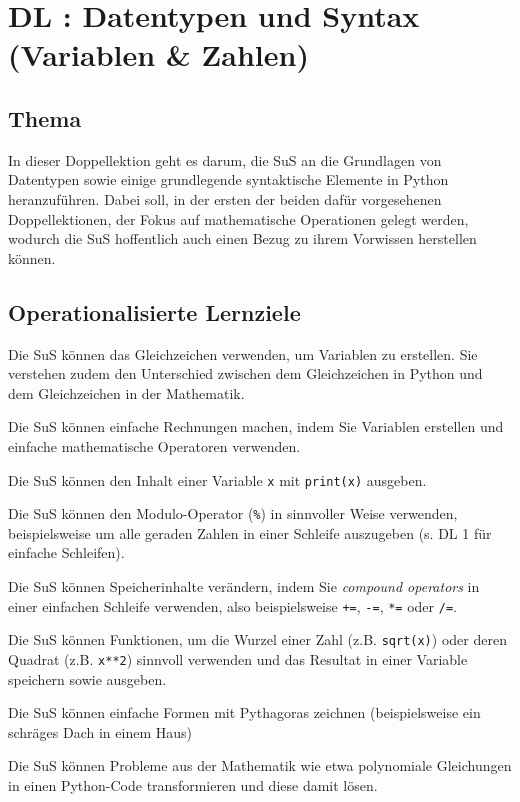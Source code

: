 \section{DL \themycounter: Datentypen und Syntax (Variablen \& Zahlen)}
\begin{myExBox}[title=DL \themycounter]
\subsection*{Thema}
In dieser Doppellektion geht es darum, die SuS an die Grundlagen von Datentypen sowie einige grundlegende syntaktische Elemente in Python heranzuführen. Dabei soll, in der ersten der beiden dafür vorgesehenen Doppellektionen, der Fokus auf mathematische Operationen gelegt werden, wodurch die SuS hoffentlich auch einen Bezug zu ihrem Vorwissen herstellen können.

\subsection*{Operationalisierte Lernziele}
\begin{todolist}
    \item Die SuS können das Gleichzeichen verwenden, um Variablen zu erstellen. Sie verstehen zudem den Unterschied zwischen dem Gleichzeichen in Python und dem Gleichzeichen in der Mathematik.
    \item Die SuS können einfache Rechnungen machen, indem Sie Variablen erstellen und einfache mathematische Operatoren verwenden.
    \item Die SuS können den Inhalt einer Variable \lstinline|x| mit \lstinline|print(x)| ausgeben.
    \item Die SuS können den Modulo-Operator (\lstinline|%|) in sinnvoller Weise verwenden, beispielsweise um alle geraden Zahlen in einer Schleife auszugeben  (s. DL 1 für einfache Schleifen).
    \item Die SuS können Speicherinhalte verändern, indem Sie \textit{compound operators} in einer einfachen Schleife verwenden, also beispielsweise \lstinline|+=|, \lstinline|-=|, \lstinline|*=| oder \lstinline|/=|.
    \item Die SuS können Funktionen, um die Wurzel einer Zahl (z.B. \lstinline|sqrt(x)|) oder deren Quadrat (z.B. \lstinline|x**2|) sinnvoll verwenden und das Resultat in einer Variable speichern sowie ausgeben.
    \item Die SuS können einfache Formen mit Pythagoras zeichnen (beispielsweise ein schräges Dach in einem Haus)
    \item Die SuS können Probleme aus der Mathematik wie etwa polynomiale Gleichungen in einen Python-Code transformieren und diese damit lösen.
\end{todolist}


\end{myExBox}
